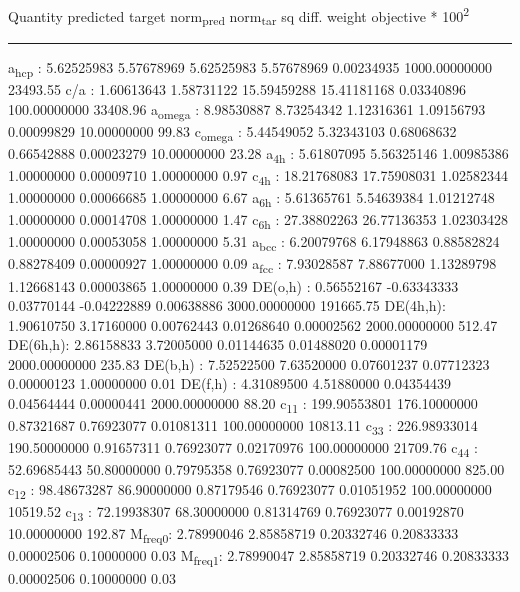 \documentclass[11pt]{article}
\begin{document}
Quantity      predicted    target     norm\textsubscript{pred}   norm\textsubscript{tar}    sq diff.      weight    objective * 100\textsuperscript{2} 

\noindent\rule{\textwidth}{0.5pt}
a\textsubscript{hcp}   :   5.62525983   5.57678969   5.62525983   5.57678969   0.00234935 1000.00000000     23493.55
c/a     :   1.60613643   1.58731122  15.59459288  15.41181168   0.03340896 100.00000000     33408.96
a\textsubscript{omega} :   8.98530887   8.73254342   1.12316361   1.09156793   0.00099829  10.00000000        99.83
c\textsubscript{omega} :   5.44549052   5.32343103   0.68068632   0.66542888   0.00023279  10.00000000        23.28
a\textsubscript{4h}    :   5.61807095   5.56325146   1.00985386   1.00000000   0.00009710   1.00000000         0.97
c\textsubscript{4h}    :  18.21768083  17.75908031   1.02582344   1.00000000   0.00066685   1.00000000         6.67
a\textsubscript{6h}    :   5.61365761   5.54639384   1.01212748   1.00000000   0.00014708   1.00000000         1.47
c\textsubscript{6h}    :  27.38802263  26.77136353   1.02303428   1.00000000   0.00053058   1.00000000         5.31
a\textsubscript{bcc}   :   6.20079768   6.17948863   0.88582824   0.88278409   0.00000927   1.00000000         0.09
a\textsubscript{fcc}   :   7.93028587   7.88677000   1.13289798   1.12668143   0.00003865   1.00000000         0.39
DE(o,h) :   0.56552167  -0.63343333   0.03770144  -0.04222889   0.00638886 3000.00000000    191665.75
DE(4h,h):   1.90610750   3.17160000   0.00762443   0.01268640   0.00002562 2000.00000000       512.47
DE(6h,h):   2.86158833   3.72005000   0.01144635   0.01488020   0.00001179 2000.00000000       235.83
DE(b,h) :   7.52522500   7.63520000   0.07601237   0.07712323   0.00000123   1.00000000         0.01
DE(f,h) :   4.31089500   4.51880000   0.04354439   0.04564444   0.00000441 2000.00000000        88.20
c\textsubscript{11}    : 199.90553801 176.10000000   0.87321687   0.76923077   0.01081311 100.00000000     10813.11
c\textsubscript{33}    : 226.98933014 190.50000000   0.91657311   0.76923077   0.02170976 100.00000000     21709.76
c\textsubscript{44}    :  52.69685443  50.80000000   0.79795358   0.76923077   0.00082500 100.00000000       825.00
c\textsubscript{12}    :  98.48673287  86.90000000   0.87179546   0.76923077   0.01051952 100.00000000     10519.52
c\textsubscript{13}    :  72.19938307  68.30000000   0.81314769   0.76923077   0.00192870  10.00000000       192.87
M\textsubscript{freq}\textsubscript{0}:   2.78990046   2.85858719   0.20332746   0.20833333   0.00002506   0.10000000         0.03
M\textsubscript{freq}\textsubscript{1}:   2.78990047   2.85858719   0.20332746   0.20833333   0.00002506   0.10000000         0.03
\end{document}
